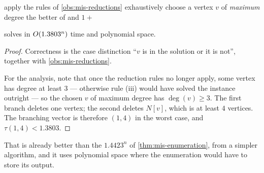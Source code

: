 \begin{algorithm}[ht]
\caption{Branch and reduce for }
\label{alg:exact-mis-branch}
\begin{algorithmic}[1]
  \State apply the rules of \cref{obs:mis-reductions} exhaustively
  \State choose a vertex $v$ of \emph{maximum} degree
  \State \Return the better of
          and $1 + $ 
\end{algorithmic}
\end{algorithm}

\begin{theorem}\label{thm:mis-branch}
 solves  in
$O\!\left(1.3803^n\right)$ time and polynomial space.
\end{theorem}

\begin{proof}
Correctness is the case distinction ``$v$ is in the solution or it is not'',
together with \cref{obs:mis-reductions}.

For the analysis, note that once the reduction rules no longer apply, some
vertex has degree at least $3$ --- otherwise rule (iii) would have solved the
instance outright --- so the chosen $v$ of maximum degree has $\deg(v) \ge 3$. The
first branch deletes one vertex; the second deletes $N[v]$, which is at least
$4$ vertices. The branching vector is therefore $(1,4)$ in the worst case, and
$\tau(1,4) < 1.3803$.
\end{proof}

That is already better than the $1.4423^n$ of \cref{thm:mis-enumeration}, from
a simpler algorithm, and it uses polynomial space where the enumeration would
have to store its output.


